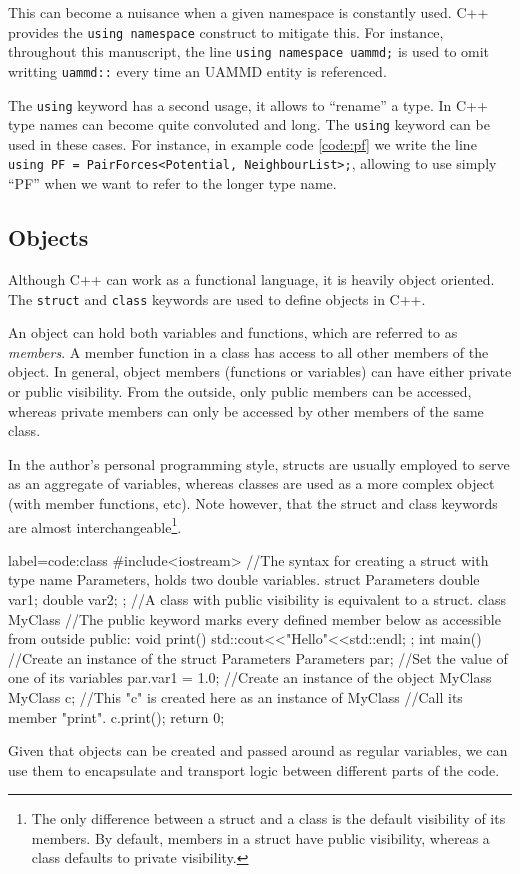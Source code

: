 \documentclass[ twoside,openright,titlepage,numbers=noenddot,%
headinclude,footinclude,cleardoublepage=empty,abstract=on,
BCOR=5mm,paper=b5,fontsize=11pt, dvipsnames
]{scrreprt}
\def\ucpp{uammd_cpp_lexer.py:UAMMDCppLexer -x}
\newcommand{\uammd}{\gls{UAMMD}\xspace}
\begin{document}
This can become a nuisance when a given namespace is constantly used. C++ provides the \texttt{using namespace} construct to mitigate this. For instance, throughout this manuscript, the line \texttt{using namespace uammd;} is used to omit writting \texttt{uammd::} every time an \uammd entity is referenced.

The \texttt{using} keyword has a second usage, it allows to ``rename'' a type. In C++ type names can become quite convoluted and long. The \texttt{using} keyword can be used in these cases. For instance, in example code \ref{code:pf} we write the line \texttt{using PF = PairForces<Potential, NeighbourList>;}, allowing to use simply ``PF'' when we want to refer to the longer type name.
\subsection*{Objects}
Although C++ can work as a functional language, it is heavily object oriented. The \texttt{struct} and \texttt{class} keywords are used to define objects in C++.

An object can hold both variables and functions, which are referred to as \emph{members}. A member function in a class has access to all other members of the object. In general, object members (functions or variables) can have either private or public visibility. From the outside, only public members can be accessed, whereas private members can only be accessed by other members of the same class.

In the author's personal programming style, structs are usually employed to serve as an aggregate of variables, whereas classes are used as a more complex object (with member functions, etc). Note however, that the struct and class keywords are almost interchangeable\footnote{The only difference between a struct and a class is the default visibility of its members. By default, members in a struct have public visibility, whereas a class defaults to private visibility.}.

\begin{code2} {label=code:class}
  #include<iostream>
  //The syntax for creating a struct with type name Parameters, holds two double variables.
  struct Parameters{
    double var1;
    double var2;    
  };
  //A class with public visibility is equivalent to a struct.
  class MyClass{
    //The public keyword marks every defined member below as accessible from outside
    public:
    void print(){
      std::cout<<"Hello"<<std::endl;
    }
  };
  int main(){
    //Create an instance of the struct Parameters
    Parameters par;
    //Set the value of one of its variables
    par.var1 = 1.0;
    //Create an instance of the object MyClass
    MyClass c;
    //This "c" is created here as an instance of MyClass
    //Call its member "print".
    c.print();
    return 0;
  }
\end{code2}
Given that objects can be created and passed around as regular variables, we can use them to encapsulate and transport logic between different parts of the code.
\end{document}
